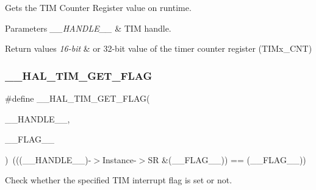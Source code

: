 Gets the T\+IM Counter Register value on runtime. 


\begin{DoxyParams}{Parameters}
{\em \+\_\+\+\_\+\+H\+A\+N\+D\+L\+E\+\_\+\+\_\+} & T\+IM handle. \\
\hline
\end{DoxyParams}

\begin{DoxyRetVals}{Return values}
{\em 16-\/bit} & or 32-\/bit value of the timer counter register (T\+I\+Mx\+\_\+\+C\+NT) \\
\hline
\end{DoxyRetVals}
\mbox{\label{group___t_i_m___exported___macros_ga96d98c66ad9d85f00c148de99888ef19}} 
\subsubsection{\texorpdfstring{\+\_\+\+\_\+\+H\+A\+L\+\_\+\+T\+I\+M\+\_\+\+G\+E\+T\+\_\+\+F\+L\+AG}{\_\_HAL\_TIM\_GET\_FLAG}}
{\footnotesize\ttfamily \#define \+\_\+\+\_\+\+H\+A\+L\+\_\+\+T\+I\+M\+\_\+\+G\+E\+T\+\_\+\+F\+L\+AG(\begin{DoxyParamCaption}\item[{}]{\+\_\+\+\_\+\+H\+A\+N\+D\+L\+E\+\_\+\+\_\+,  }\item[{}]{\+\_\+\+\_\+\+F\+L\+A\+G\+\_\+\+\_\+ }\end{DoxyParamCaption})~(((\+\_\+\+\_\+\+H\+A\+N\+D\+L\+E\+\_\+\+\_\+)-\/$>$Instance-\/$>$SR \&(\+\_\+\+\_\+\+F\+L\+A\+G\+\_\+\+\_\+)) == (\+\_\+\+\_\+\+F\+L\+A\+G\+\_\+\+\_\+))}



Check whether the specified T\+IM interrupt flag is set or not. 



